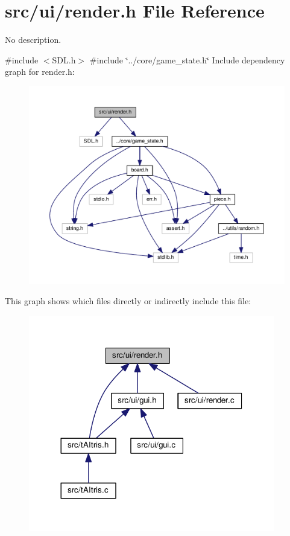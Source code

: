 \section{src/ui/render.h File Reference}
\label{render_8h}


No description.  


{\ttfamily \#include $<$S\+D\+L.\+h$>$}\newline
{\ttfamily \#include \char`\"{}../core/game\+\_\+state.\+h\char`\"{}}\newline
Include dependency graph for render.\+h\+:
\nopagebreak
\begin{figure}[H]
\begin{center}
\leavevmode
\includegraphics[width=350pt]{render_8h__incl}
\end{center}
\end{figure}
This graph shows which files directly or indirectly include this file\+:
\nopagebreak
\begin{figure}[H]
\begin{center}
\leavevmode
\includegraphics[width=305pt]{render_8h__dep__incl}
\end{center}
\end{figure}
